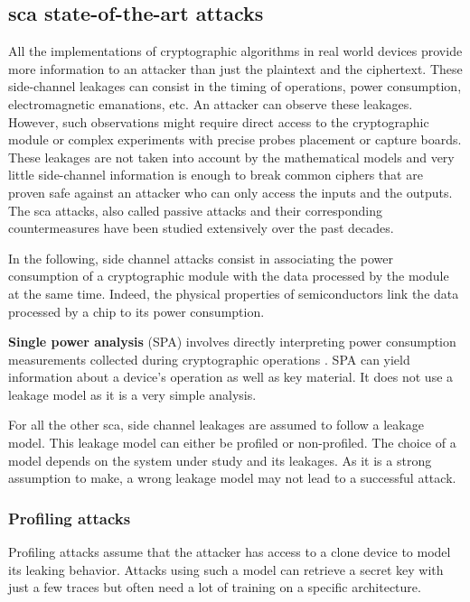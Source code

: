 \documentclass[11pt]{sdm}
\begin{document}
\subsection{\acrlong{sca} state-of-the-art attacks}

All the implementations of cryptographic algorithms in real world devices provide more information to an attacker than just the plaintext and the ciphertext.
These side-channel leakages can consist in the timing of operations, power consumption, electromagnetic emanations, etc.
An attacker can observe these leakages.
However, such observations might require direct access to the cryptographic module or complex experiments with precise probes placement or capture boards.
These leakages are not taken into account by the mathematical models and very little side-channel information is enough to break common ciphers that are proven safe against an attacker who can only access the inputs and the outputs.
The \gls{sca} attacks, also called passive attacks and their corresponding countermeasures have been studied extensively over the past decades.

In the following, side channel attacks consist in associating the power consumption of a cryptographic module with the data processed by the module at the same time.
Indeed, the physical properties of semiconductors link the data processed by a chip to its power consumption.

\textbf{Single power analysis} (SPA) involves directly interpreting power consumption measurements collected during cryptographic operations \parencite{Kocher_Jaffe_Jun_1999}.
SPA can yield information about a device's operation as well as key material.
It does not use a leakage model as it is a very simple analysis.

For all the other \gls{sca}, side channel leakages are assumed to follow a leakage model.
This leakage model can either be profiled or non-profiled.
The choice of a model depends on the system under study and its leakages.
As it is a strong assumption to make, a wrong leakage model may not lead to a successful attack.

\subsubsection{Profiling attacks}

Profiling attacks assume that the attacker has access to a clone device to model its leaking behavior.
Attacks using such a model can retrieve a secret key with just a few traces but often need a lot of training on a specific architecture.
\end{document}
